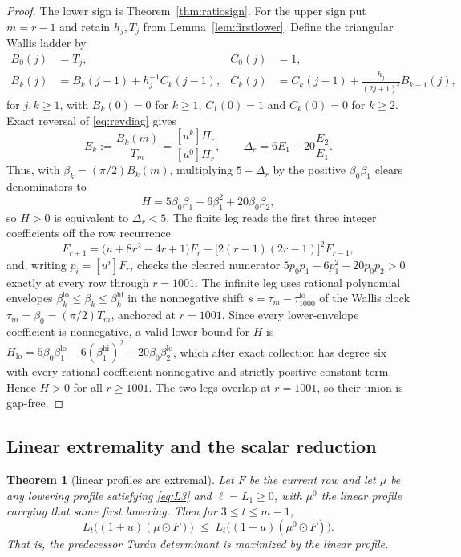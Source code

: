 \documentclass[11pt,a4paper]{article}
\theoremstyle{plain}
\newtheorem{theorem}{Theorem}[section]
\theoremstyle{definition}
\theoremstyle{remark}
\begin{document}
\begin{proof}
The lower sign is Theorem~\ref{thm:ratiosign}. For the upper sign put $m=r-1$
and retain $h_j,T_j$ from Lemma~\ref{lem:firstlower}. Define the triangular
Wallis ladder by
\[
\begin{aligned}
B_0(j)&=T_j,& C_0(j)&=1,\\
B_k(j)&=B_k(j-1)+h_j^{-1}C_k(j-1),&
C_k(j)&=C_k(j-1)+\frac{h_j}{(2j+1)^2}B_{k-1}(j),
\end{aligned}
\]
for $j,k\ge1$, with $B_k(0)=0$ for $k\ge1$, $C_1(0)=1$ and $C_k(0)=0$
for $k\ge2$. Exact reversal of \eqref{eq:revdiag} gives
\[
 E_k:=\frac{B_k(m)}{T_m}
 =\frac{[u^k]\Pi_r}{[u^0]\Pi_r},\qquad
 \Delta_r=6E_1-20\frac{E_2}{E_1}.
\]
Thus, with $\beta_k=(\pi/2)B_k(m)$, multiplying $5-\Delta_r$ by the
positive $\beta_0\beta_1$ clears denominators to
\begin{equation}\label{eq:H5}
  H=5\beta_0\beta_1-6\beta_1^2+20\beta_0\beta_2,
\end{equation}
so $H>0$ is equivalent to $\Delta_r<5$. The finite leg reads the first three
integer coefficients off the row recurrence
\begin{equation}\label{eq:rowrec}
  F_{r+1}=\bigl(u+8r^2-4r+1\bigr)F_r-\bigl[2(r-1)(2r-1)\bigr]^2F_{r-1},
\end{equation}
and, writing $p_i=[u^i]F_r$, checks the cleared numerator
$5p_0p_1-6p_1^2+20p_0p_2>0$ exactly at every row through $r=1001$. The infinite
leg uses rational polynomial envelopes
$\beta_k^{\mathrm{lo}}\le\beta_k\le\beta_k^{\mathrm{hi}}$ in the nonnegative
shift $s=\tau_m-\tau_{1000}^{\mathrm{lo}}$ of the Wallis clock
$\tau_m=\beta_0=(\pi/2)T_m$, anchored at $r=1001$. Since every lower-envelope
coefficient is nonnegative, a valid lower bound for $H$ is
$H_{\mathrm{lo}}=5\beta_0\beta_1^{\mathrm{lo}}-6(\beta_1^{\mathrm{hi}})^2
+20\beta_0\beta_2^{\mathrm{lo}}$, which after exact collection has degree six
with every rational coefficient nonnegative and strictly positive constant
term. Hence $H>0$ for all $r\ge1001$. The two legs overlap at $r=1001$, so
their union is gap-free.
\end{proof}

\subsection{Linear extremality and the scalar reduction}\label{sec:lin}

\begin{theorem}[linear profiles are extremal]\label{thm:lin}
Let $F$ be the current row and let $\mu$ be any lowering profile satisfying
\eqref{eq:L3} and $\ell=L_1\ge0$, with $\mu^0$ the linear profile carrying that
same first lowering. Then for $3\le t\le m-1$,
\[
  L_t\bigl((1+u)(\mu\odot F)\bigr)\;\le\;L_t\bigl((1+u)(\mu^0\odot F)\bigr).
\]
That is, the predecessor Tur\'an determinant is maximized by the linear profile.
\end{theorem}
\end{document}
